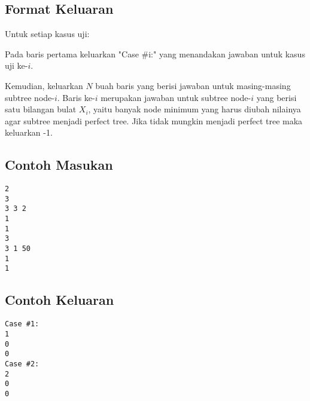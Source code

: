 \documentclass{article}
\begin{document}
\subsection*{Format Keluaran}

Untuk setiap kasus uji:

Pada baris pertama keluarkan "Case #i:" yang menandakan jawaban untuk kasus uji ke-$i$. 

Kemudian, keluarkan $N$ buah baris yang berisi jawaban untuk masing-masing subtree node-$i$. Baris ke-$i$ merupakan jawaban untuk subtree node-$i$ yang berisi satu bilangan bulat $X_i$, yaitu banyak node minimum yang harus diubah nilainya agar subtree menjadi perfect tree. Jika tidak mungkin menjadi perfect tree maka keluarkan -1.
\\

\begin{multicols}{2}
\subsection*{Contoh Masukan}
\begin{lstlisting}
2
3
3 3 2
1
1
3
3 1 50
1
1

\end{lstlisting}
\columnbreak
\subsection*{Contoh Keluaran}
\begin{lstlisting}
Case #1:
1
0
0
Case #2:
2
0
0
\end{lstlisting}
\vfill
\null
\end{multicols}


\pagebreak
\end{document}
